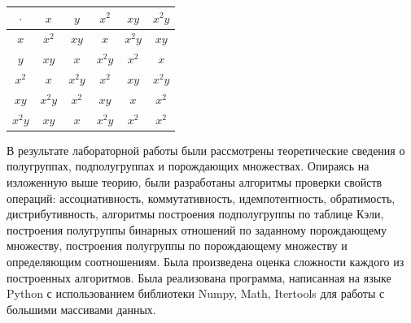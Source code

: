 \documentclass[bachelor, och, labwork]{shiza}
\begin{document}
     \begin{table}[H]
          \centering
          \begin{tabular}{|c|c|c|c|c|c|}
          \hline
          $\cdot $ & $x$ & $y$  & $x^2$  & $xy$ & $x^2y$ \\ \hline
          $x$      & $x^2$ & $xy$ & $x$  & $x^2y$ & $xy$ \\ \hline
          $y$      & $xy$ & $x$ & $x^2y$ & $x^2$ & $x$ \\ \hline
          $x^2$     & $x$ & $x^2y$ & $x^2$ & $xy$ & $x^2y$ \\ \hline
          $xy$    & $x^2y$ & $x^2$ & $xy$ & $x$ & $x^2$ \\ \hline
          $x^2y$   & $xy$ &  $x$  &  $x^2y$ & $x^2$ & $x^2$ \\ \hline
          \end{tabular}
        \end{table}
    \conclusion
    
    В результате лабораторной работы были рассмотрены теоретические сведения о полугруппах, подполугруппах и
    порождающих множествах. Опираясь на изложенную
    выше теорию, были разработаны алгоритмы проверки свойств операций: ассоциативность, коммутативность, идемпотентность, обратимость,
    дистрибутивность, алгоритмы построения подполугруппы по таблице Кэли, построения
    полугруппы бинарных отношений по заданному порождающему множеству, построения полугруппы по порождающему множеству и
    определяющим соотношениям. Была произведена оценка сложности каждого из  построенных алгоритмов. Была реализована программа, написанная на языке Python
    с использованием библиотеки Numpy, Math, Itertools для работы с большими массивами данных.
    
\end{document}
